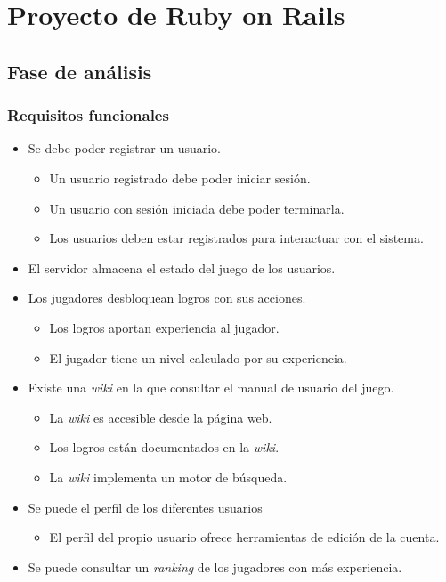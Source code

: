 \chapter{Proyecto de Ruby on Rails}

\section{Fase de análisis}

\subsection{Requisitos funcionales}

\begin{itemize}
	\item
		Se debe poder registrar un usuario.
		\begin{itemize}
			\item
				Un usuario registrado debe poder iniciar sesión.
			\item
				Un usuario con sesión iniciada debe poder terminarla.
			\item
				Los usuarios deben estar registrados para interactuar con el sistema.
		\end{itemize}
	\item
		El servidor almacena el estado del juego de los usuarios.
	\item
		Los jugadores desbloquean logros con sus acciones.
		\begin{itemize}
			\item
				Los logros aportan experiencia al jugador.
			\item
				El jugador tiene un nivel calculado por su experiencia.
		\end{itemize}
	\item
		Existe una \textit{wiki} en la que consultar el manual de usuario del juego.
		\begin{itemize}
			\item
				La \textit{wiki} es accesible desde la página web.
			\item
				Los logros están documentados en la \textit{wiki}.
			\item
				La \textit{wiki} implementa un motor de búsqueda.
		\end{itemize}
	\item
		Se puede el perfil de los diferentes usuarios
		\begin{itemize}
			\item
				El perfil del propio usuario ofrece herramientas de edición de la cuenta.
		\end{itemize}
	\item
		Se puede consultar un \textit{ranking} de los jugadores con más experiencia.
\end{itemize}

